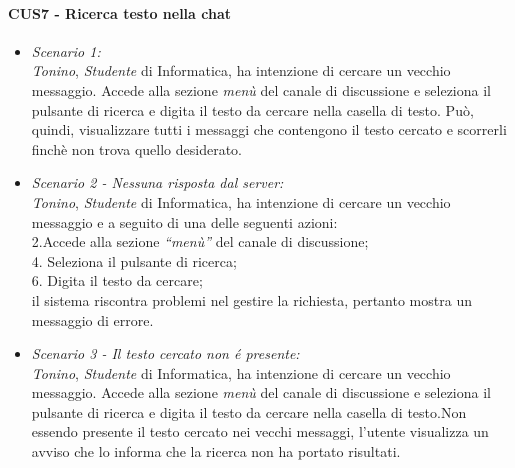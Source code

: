 \paragraph{CUS7 - Ricerca testo nella chat\\}
\begin{itemize}
\item \textit{Scenario 1:\\}
\textit{Tonino}, \textit{Studente} di Informatica, ha intenzione di cercare un vecchio messaggio. Accede alla sezione \textit{menù} del canale di discussione e seleziona il pulsante di ricerca e digita il testo da cercare nella casella di testo. 
Può, quindi, visualizzare tutti i messaggi che contengono il testo cercato e scorrerli finchè non trova quello desiderato.\\

\item \textit{Scenario 2 - Nessuna risposta dal server:\\}
\textit{Tonino}, \textit{Studente} di Informatica, ha intenzione di cercare un vecchio messaggio e a seguito di una delle seguenti azioni:\\
2.Accede alla sezione \textit{“menù”} del canale di discussione;\\
4. Seleziona il pulsante di ricerca;\\
6. Digita il testo da cercare;\\
il sistema riscontra problemi nel gestire la richiesta, pertanto mostra un messaggio di errore.\\

\item \textit{Scenario 3 - Il testo cercato non é presente:\\}
\textit{Tonino}, \textit{Studente} di Informatica, ha intenzione di cercare un vecchio messaggio. Accede alla sezione \textit{menù} del canale di discussione e seleziona il pulsante di ricerca e digita il testo da cercare nella casella di testo.Non essendo presente il testo cercato nei vecchi messaggi, l’utente visualizza un avviso che lo informa che la ricerca non ha portato risultati.\\

\end{itemize}



